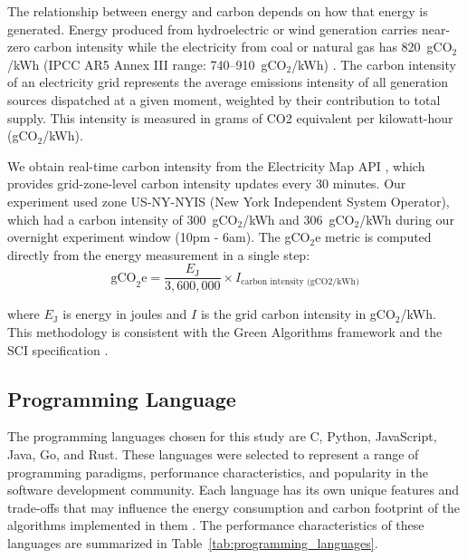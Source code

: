 The relationship between energy and carbon depends on how that energy is generated. Energy produced from hydroelectric or wind generation carries near-zero carbon intensity while the electricity from coal or natural gas has 820~gCO$_2$/kWh (IPCC AR5 Annex III range: 740--910~gCO$_2$/kWh) \cite{ipcc2014lifecycle}. The carbon intensity of an electricity grid represents the average emissions intensity of all generation sources dispatched at a given moment, weighted by their contribution to total supply. This intensity is measured in grams of CO2 equivalent per kilowatt-hour (gCO$_2$/kWh). 

We obtain real-time carbon intensity from the Electricity Map API \cite{electricitymap}, which provides grid-zone-level carbon intensity updates every 30 minutes. Our experiment used zone US-NY-NYIS (New York Independent System Operator), which had a carbon intensity of 300~gCO$_2$/kWh and 306~gCO$_2$/kWh during our overnight experiment window (10pm - 6am). 
The gCO$_2$e metric is computed directly from the energy measurement in a single step:
\begin{equation}
  \text{gCO}_2\text{e} = \frac{E_{\text{J}}}{3{,}600{,}000} \times I_{\text{carbon intensity (gCO2/kWh)}}
  \label{eq:gco2e}
\end{equation}

where $E_{\text{J}}$ is energy in joules and $I$ is the grid carbon intensity in gCO$_2$/kWh. This methodology is consistent with the Green Algorithms framework \cite{lannelongue2021} and the SCI specification \cite{grnsoftware2023}.



\subsection{Programming Language}
The programming languages chosen for this study are C, Python, JavaScript, Java, Go, and Rust. These languages were selected to represent a range of programming paradigms, performance characteristics, and popularity in the software development community. Each language has its own unique features and trade-offs that may influence the energy consumption and carbon footprint of the algorithms implemented in them \cite{decisionmodels}. The performance characteristics of these languages are summarized in Table~\ref{tab:programming_languages}.

